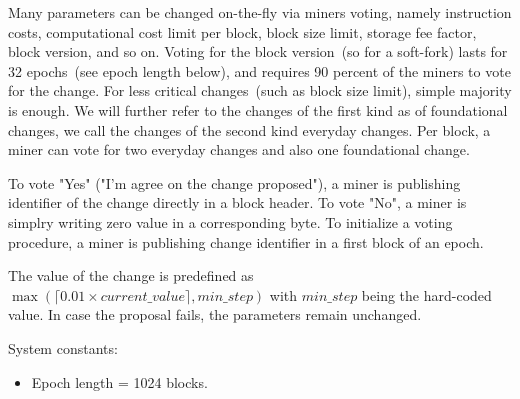 Many parameters can be changed on-the-fly via miners voting, namely instruction costs, computational cost limit per block,
block size limit, storage fee factor, block version, and so on. Voting for the block version~(so for a soft-fork)
lasts for 32 epochs~(see epoch length below), and requires 90 percent of the miners to vote for the change.
For less critical changes~(such as block size limit), simple majority is enough. We will further refer to the changes
of the first kind as of foundational changes, we call the changes of the second kind everyday changes.
Per block, a miner can vote for two everyday changes and also one foundational change.

To vote "Yes" ("I'm agree on the change proposed"), a miner is publishing identifier of the change directly in a
block header. To vote "No", a miner is simplry writing zero value in a corresponding byte. To initialize a voting
procedure, a miner is publishing change identifier in a first block of an epoch.


The value of the change is predefined as $\max(\lceil0.01 \times current\_value\rceil, min\_step)$ with $min\_step$
being the hard-coded value. In case the proposal fails, the parameters
remain unchanged.

System constants:
\begin{itemize}
\item{} Epoch length = 1024 blocks.
\end{itemize}


